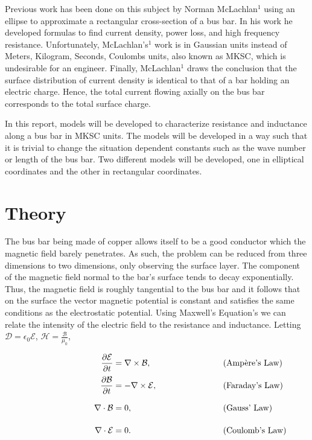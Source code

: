 \documentclass[11pt]{article}
\begin{document}
Previous work has been done on this subject by Norman McLachlan$^1$
using an ellipse to approximate a rectangular cross-section of a bus bar. In his work
he developed formulas to find current density, power loss, and high
frequency resistance. Unfortunately, McLachlan's$^1$ work is in
Gaussian units instead of Meters, Kilogram, Seconds, Coulombs units, also known as MKSC, which is undesirable for an
engineer. Finally, McLachlan$^1$ draws the conclusion that the surface
distribution of current density is identical to that of a bar holding an
electric charge. Hence, the total current flowing axially on the bus bar
corresponds to the total surface charge.

In this report, models will be developed to characterize resistance and inductance
along a bus bar in MKSC units. The models will be developed in a way such that it is trivial to
change the situation dependent constants such as the wave number or length
of the bus bar. Two different models will be developed, one in elliptical coordinates
and the other in rectangular coordinates. 

\section{Theory}

The bus bar being made of copper allows itself to be a good conductor
which the magnetic field barely penetrates. As such, the problem can be
reduced from three dimensions to two dimensions, only observing the
surface layer. The component of the magnetic field normal to the bar's
surface tends to decay exponentially. Thus, the magnetic field is
roughly tangential to the bus bar and it follows that on the surface the
vector magnetic potential is constant and satisfies the same conditions
as the electrostatic potential. Using Maxwell's Equation's we can relate
the intensity of the electric field to the resistance and inductance.
Letting $\mathcal D = \epsilon _0 \mathcal E$, $\mathcal H = \frac{\mathcal B}{\mu _0}$, 

\begin{equation}
	\begin{alignedat}{3}
		& \hskip8em & \frac{\partial \mathcal{E}}{\partial t}& = \nabla \times \mathcal{B}, & \hskip8em &\text{(Ampère's Law)} \\[0.5ex]
		& & \frac{\partial\mathcal{B}}{\partial t}& = -\nabla \times \mathcal{E}, & &\text{(Faraday's Law)} \\[0.5ex]
		&\vphantom{\frac{\partial B}{\partial t}} &\nabla \cdot \mathcal{B} & =0, & &\text{(Gauss' Law)} \\[0.5ex]
		&\vphantom{\frac{\partial B}{\partial t}} &\nabla \cdot \mathcal{E} & =0. & &\text{(Coulomb's Law)}
	\end{alignedat}
\end{equation}
\end{document}

